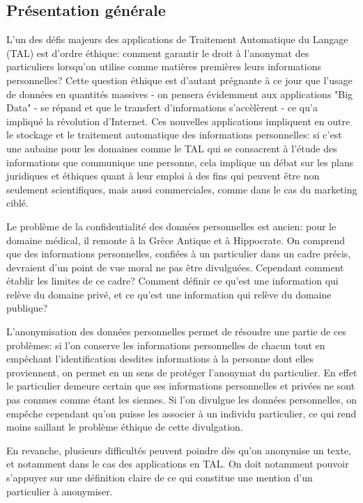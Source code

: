\documentclass{article}
\begin{document}
\subsection{Présentation générale}
\par
L'un des défis majeurs des applications de Traitement Automatique du Langage (TAL) est d'ordre éthique: comment garantir le droit à l'anonymat des particuliers lorsqu'on utilise comme matières premières leurs informations personnelles?
Cette question éthique est d'autant prégnante à ce jour que l'usage de données en quantités massives - on pensera évidemment aux applications "Big Data" - se répand et que le transfert d'informations s'accèlèrent - ce qu'a impliqué la révolution d'Internet.
Ces nouvelles applications impliquent en outre le stockage et le traitement automatique des informations personnelles: si c'est une aubaine pour les domaines comme le TAL qui se consacrent à l'étude des informations que communique une personne, cela implique un débat sur les plans juridiques et éthiques quant à leur emploi à des fins qui peuvent être non seulement scientifiques, mais aussi commerciales, comme dans le cas du marketing ciblé.
\par
Le problème de la confidentialité des données personnelles est ancien: pour le domaine médical, il remonte à la Grèce Antique et à Hippocrate.
On comprend que des informations personnelles, confiées à un particulier dans un cadre précis, devraient d'un point de vue moral ne pas être divulguées.
Cependant comment établir les limites de ce cadre?
Comment définir ce qu'est une information qui relève du domaine privé, et ce qu'est une information qui relève du domaine publique?
\par
L'anonymisation des données personnelles permet de résoudre une partie de ces problèmes: si l'on conserve les informations personnelles de chacun tout en empêchant l'identification desdites informations à la personne dont elles proviennent, on permet en un sens de protéger l'anonymat du particulier.
En effet le particulier demeure certain que ses informations personnelles et privées ne sont pas connues comme étant les siennes.
Si l'on divulgue les données personnelles, on empêche cependant qu'on puisse les associer à un individu particulier, ce qui rend moins saillant le problème éthique de cette divulgation.
\par
En revanche, plusieurs difficultés peuvent poindre dès qu'on anonymise un texte, et notamment dans le cas des applications en TAL.
On doit notamment pouvoir s'appuyer sur une définition claire de ce qui constitue une mention d'un particulier à anonymiser.
\end{document}
